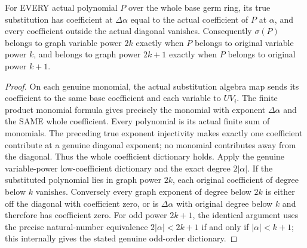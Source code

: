 \begin{theorem}
\label{hir:relative-normal-graph-diagonal-whole-coefficients}
\leanok
For EVERY actual polynomial $P$ over the whole base germ ring, its true substitution has coefficient at $\Delta\alpha$ equal to the actual coefficient of $P$ at $\alpha$, and every coefficient outside the actual diagonal vanishes. Consequently $\sigma(P)$ belongs to graph variable power $2k$ exactly when $P$ belongs to original variable power $k$, and belongs to graph power $2k+1$ exactly when $P$ belongs to original power $k+1$.
\end{theorem}
\begin{proof}
On each genuine monomial, the actual substitution algebra map sends its coefficient to the same base coefficient and each variable to $UV_i$. The finite product monomial formula gives precisely the monomial with exponent $\Delta\alpha$ and the SAME whole coefficient. Every polynomial is its actual finite sum of monomials. The preceding true exponent injectivity makes exactly one coefficient contribute at a genuine diagonal exponent; no monomial contributes away from the diagonal. Thus the whole coefficient dictionary holds. Apply the genuine variable-power low-coefficient dictionary and the exact degree $2|\alpha|$. If the substituted polynomial lies in graph power $2k$, each original coefficient of degree below $k$ vanishes. Conversely every graph exponent of degree below $2k$ is either off the diagonal with coefficient zero, or is $\Delta\alpha$ with original degree below $k$ and therefore has coefficient zero. For odd power $2k+1$, the identical argument uses the precise natural-number equivalence $2|\alpha|<2k+1$ if and only if $|\alpha|<k+1$; this internally gives the stated genuine odd-order dictionary.
\end{proof}


